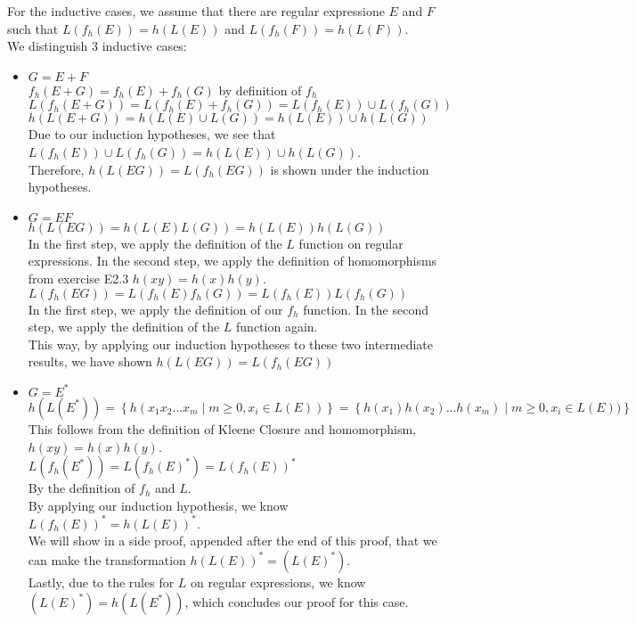 For the inductive cases, we assume that there are regular expressione $E$ and $F$ such that $L(f_{h}(E)) = h(L(E))$ and $L(f_{h}(F)) = h(L(F))$.\\
We distinguish 3 inductive cases:\\
\begin{itemize}
    \item $G = E + F$\\
    $f_{h}(E+G) = f_{h}(E) + f_{h}(G)$ by definition of $f_{h}$\\
    $L(f_{h}(E+G)) = L(f_{h}(E) + f_{h}(G)) = L(f_{h}(E)) \cup L(f_{h}(G))$\\
    $h(L(E+G)) = h(L(E)\cup L(G)) = h(L(E)) \cup h(L(G))$\\
    Due to our induction hypotheses, we see that $L(f_{h}(E)) \cup L(f_{h}(G)) = h(L(E)) \cup h(L(G))$.\\
    Therefore, $h(L(EG)) = L(f_{h}(EG))$ is shown under the induction hypotheses.\\
    \item $G = EF$\\
    $h(L(EG)) = h(L(E)L(G)) = h(L(E))h(L(G))$\\
    In the first step, we apply the definition of the $L$ function on regular expressions. In the second step, we apply the definition of homomorphisms from exercise E2.3 $h(xy)=h(x)h(y)$.\\
    $L(f_{h}(EG)) = L(f_{h}(E)f_{h}(G)) = L(f_{h}(E))L(f_{h}(G))$\\
    In the first step, we apply the definition of our $f_{h}$ function. In the second step, we apply the definition of the $L$ function again.\\
    This way, by applying our induction hypotheses to these two intermediate results, we have shown $h(L(EG)) = L(f_{h}(EG))$\\
    \item $G = E^{\ast}$\\
    $h(L(E^{\ast})) = \left\{ h(x_{1}x_{2}\ldots x_{m} \mid m \geq 0, x_{i} \in L(E))\right\} = \left\{ h(x_{1})h(x_{2})\ldots h(x_{m}) \mid m \geq 0, x_{i} \in L(E))\right\}$\\
    This follows from the definition of Kleene Closure and homomorphism, $h(xy)=h(x)h(y)$.\\
    $L(f_{h}(E^{\ast})) = L(f_{h}(E)^{\ast}) = L(f_{h}(E))^{\ast}$\\
    By the definition of $f_{h}$ and $L$.\\
    By applying our induction hypothesis, we know $L(f_{h}(E))^{\ast} = h(L(E))^{\ast}$.\\
    We will show in a side proof, appended after the end of this proof, that we can make the transformation $h(L(E))^{\ast} = (L(E)^{\ast})$.\\
    Lastly, due to the rules for $L$ on regular expressions, we know $(L(E)^{\ast}) = h(L(E^{\ast}))$, which concludes our proof for this case.\\
\end{itemize}

